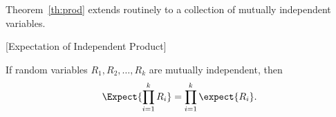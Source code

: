 \iffalse
\begin{proof}
The event $[R_1 \cdot R_2=r]$ can be split up into events of the form
$[R_1 = r_1\ \text{ and }\ R_2 = r_2]$ where $r_1\cdot r_2=r$.  So
\begin{align*}
\lefteqn{\expect{R_1 \cdot R_2}}\\
& \eqdef \sum_{r \in \range{R_1\cdot R_2}} r\cdot \pr{R_1\cdot R_2=r}\\
\iffalse
& =      \sum_{\scriptsize \begin{aligned}
                       r_1 \in \range{R_1},\\
                       r_2 \in \range{R_2}
                      \end{aligned}}\fi
& =      \sum_{r_i \in \range{R_i}}
            r_1 r_2 \cdot \pr{R_1=r_1\ \text{ and }\ R_2=r_2}\\
& =      \sum_{r_1 \in \range{R_1}} \sum_{r_2 \in \range{R_2}}
            r_1 r_2 \cdot \pr{R_1=r_1\ \text{ and }\ R_2=r_2}
                    &\text{(ordering terms in the sum)}\\
& =      \sum_{r_1 \in \range{R_1}} \sum_{r_2 \in \range{R_2}}
            r_1 r_2 \cdot \pr{R_1=r_1}\cdot \pr{R_2=r_2}
                    &\text{(indep.\ of $R_1,R_2$)}\\
& =      \sum_{r_1 \in \range{R_1}} \paren{r_1\pr{R_1=r_1} \cdot
              \sum_{r_2 \in \range{R_2}} r_2 \pr{R_2=r_2}}
                    &\text{(factoring out $r_1\pr{R_1=r_1}$)}\\
& =      \sum_{r_1 \in \range{R_1}} r_1\pr{R_1=r_1} \cdot \expect{R_2}
                    &\text{(def of $\expect{R_2}$)}\\
& =       \expect{R_2} \cdot \sum_{r_1 \in \range{R_1}} r_1\pr{R_1=r_1}
                    &\text{(factoring out $\expect{R_2}$)}\\
& =       \expect{R_2} \cdot  \expect{R_1}.
                    &\text{(def of $\expect{R_1}$)}
\end{align*}

\end{proof}
\fi

Theorem~\ref{th:prod} extends routinely to a collection of mutually
independent variables.
\begin{corollary}\label{cor:indep_prod}[Expectation of Independent Product]

If random variables $R_1, R_2, \dots, R_k$ are mutually
independent, then
\[
\Expect{\prod_{i=1}^k R_i} = \prod_{i=1}^k \expect{R_i}.
\]
\end{corollary}

